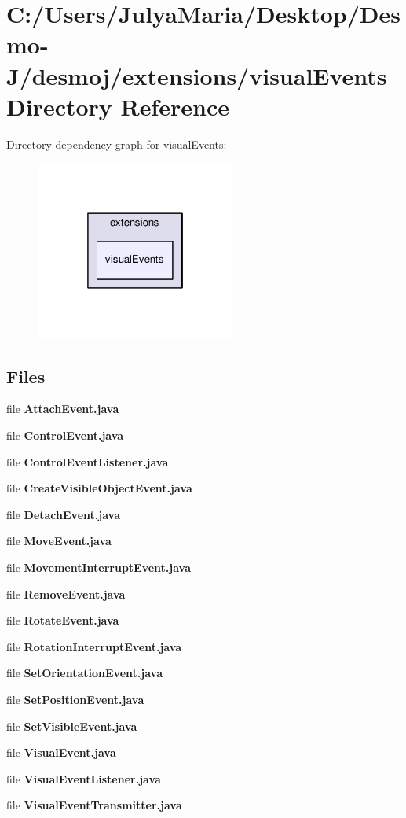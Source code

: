 \section{C\-:/\-Users/\-Julya\-Maria/\-Desktop/\-Desmo-\/\-J/desmoj/extensions/visual\-Events Directory Reference}
\label{dir_9b06d81b12f8d1fd5358b3e64e5bdd6f}
Directory dependency graph for visual\-Events\-:
\nopagebreak
\begin{figure}[H]
\begin{center}
\leavevmode
\includegraphics[width=186pt]{dir_9b06d81b12f8d1fd5358b3e64e5bdd6f_dep}
\end{center}
\end{figure}
\subsection*{Files}
\begin{DoxyCompactItemize}
\item 
file {\bfseries Attach\-Event.\-java}
\item 
file {\bfseries Control\-Event.\-java}
\item 
file {\bfseries Control\-Event\-Listener.\-java}
\item 
file {\bfseries Create\-Visible\-Object\-Event.\-java}
\item 
file {\bfseries Detach\-Event.\-java}
\item 
file {\bfseries Move\-Event.\-java}
\item 
file {\bfseries Movement\-Interrupt\-Event.\-java}
\item 
file {\bfseries Remove\-Event.\-java}
\item 
file {\bfseries Rotate\-Event.\-java}
\item 
file {\bfseries Rotation\-Interrupt\-Event.\-java}
\item 
file {\bfseries Set\-Orientation\-Event.\-java}
\item 
file {\bfseries Set\-Position\-Event.\-java}
\item 
file {\bfseries Set\-Visible\-Event.\-java}
\item 
file {\bfseries Visual\-Event.\-java}
\item 
file {\bfseries Visual\-Event\-Listener.\-java}
\item 
file {\bfseries Visual\-Event\-Transmitter.\-java}
\end{DoxyCompactItemize}
